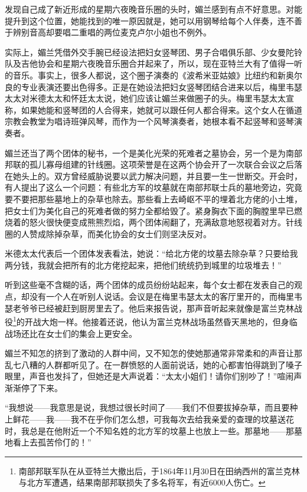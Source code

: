 \par 发现自己成了新近形成的星期六夜晚音乐圈的头时，媚兰感到有点不好意思。对能提升到这个位置，她能找到的唯一原因就是，她可以用钢琴给每个人伴奏，连不善于辨别音高却要唱二重唱的两位麦克卢尔小姐也不例外。
\par 实际上，媚兰凭借外交手腕已经设法把妇女竖琴团、男子合唱俱乐部、少女曼陀铃队及吉他协会和星期六夜晚音乐圈合并起来了，所以，现在亚特兰大有了值得一听的音乐。事实上，很多人都说，这个圈子演奏的《波希米亚姑娘》比纽约和新奥尔良的专业表演还要出色得多。正是在她设法把妇女竖琴团结合进来以后，梅里韦瑟太太对米德太太和怀廷太太说，她们应该让媚兰来做圈子的头。梅里韦瑟太太宣称，如果她能和竖琴团的人合得来，她就可以跟任何人都合得来。这个女人在循道宗教会教堂为唱诗班弹风琴，而作为一个风琴演奏者，她根本看不起竖琴和竖琴演奏者。
\par 媚兰还当了两个团体的秘书，一个是美化光荣的死难者之墓协会，另一个是为南部邦联的孤儿寡母组建的针线圈。这项荣誉是在这两个协会开了一次联合会议之后落在她头上的。双方曾经威胁说要以武力解决问题，并且要一生一世断交。开会时，有人提出了这么一个问题：有些北方军的坟墓就在南部邦联士兵的墓地旁边，究竟要不要把那些墓地上的杂草也除去。那些看上去崎岖不平的埋着北方佬的小土堆，把女士们为美化自己的死难者做的努力全都给毁了。紧身胸衣下面的胸膛里早已燃烧着的怒火很快便变成熊熊烈焰，两个团体闹翻了，充满敌意地怒视着对方。针线圈的人赞成除掉杂草，而美化协会的女士们则坚决反对。
\par 米德太太代表后一个团体发表看法，她说：“给北方佬的坟墓去除杂草？只要给我两分钱，我就会把所有的北方佬挖起来，把他们统统扔到城里的垃圾堆去！”
\par 听到这些毫不含糊的话，两个团体的成员纷纷站起来，每个女士都在发表自己的观点，却没有一个人在听别人说话。会议是在梅里韦瑟太太的客厅里开的，而梅里韦瑟老爷爷已经被赶到厨房里去了。他后来报告说，那声音听起来就像是富兰克林战役\footnote{南部邦联军队在从亚特兰大撤出后，于1864年11月30日在田纳西州的富兰克林与北方军遭遇，结果南部邦联损失了多名将军，有近6000人伤亡。}的开战大炮一样。他接着还说，他认为富兰克林战场虽然昏天黑地的，但身临战场还比在女士们的集会上更安全。
\par 媚兰不知怎的挤到了激动的人群中间，又不知怎的使她那通常非常柔和的声音让那乱七八糟的人群都听见了。在一群愤怒的人面前说话，她的心都害怕得跳到了嗓子眼里，声音也发抖了，但她还是大声说着：“太太小姐们！请你们别吵了！”喧闹声渐渐停了下来。
\par “我想说——我意思是说，我想过很长时间了——我们不但要拔掉杂草，而且要种上鲜花——我——我不在乎你们怎么想，可我每次去给我亲爱的查理的坟墓送花时，我总是在他附近一个不知名姓的北方军的坟墓上也放上一些。那墓地——那墓地看上去孤苦伶仃的！”
